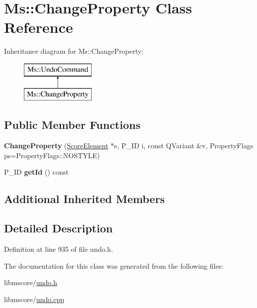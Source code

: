 \hypertarget{class_ms_1_1_change_property}{}\section{Ms\+:\+:Change\+Property Class Reference}
\label{class_ms_1_1_change_property}
Inheritance diagram for Ms\+:\+:Change\+Property\+:\begin{figure}[H]
\begin{center}
\leavevmode
\includegraphics[height=2.000000cm]{class_ms_1_1_change_property}
\end{center}
\end{figure}
\subsection*{Public Member Functions}
\begin{DoxyCompactItemize}
\item 
\mbox{\label{class_ms_1_1_change_property_ab53e44efea1071d6dc580733142b789f}} 
{\bfseries Change\+Property} (\hyperlink{class_ms_1_1_score_element}{Score\+Element} $\ast$e, P\+\_\+\+ID i, const Q\+Variant \&v, Property\+Flags ps=Property\+Flags\+::\+N\+O\+S\+T\+Y\+LE)
\item 
\mbox{\label{class_ms_1_1_change_property_a18d4760e2cd51fc6f3ca4aa65122d872}} 
P\+\_\+\+ID {\bfseries get\+Id} () const
\end{DoxyCompactItemize}
\subsection*{Additional Inherited Members}


\subsection{Detailed Description}


Definition at line 935 of file undo.\+h.



The documentation for this class was generated from the following files\+:\begin{DoxyCompactItemize}
\item 
libmscore/\hyperlink{undo_8h}{undo.\+h}\item 
libmscore/\hyperlink{undo_8cpp}{undo.\+cpp}\end{DoxyCompactItemize}
